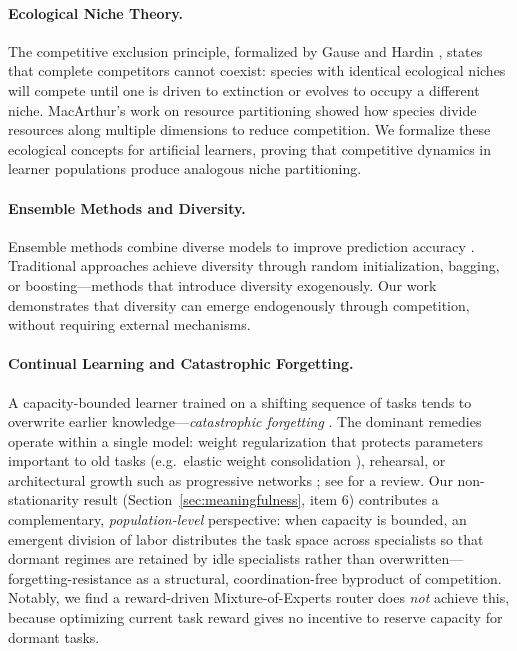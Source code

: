 \documentclass{article}
\begin{document}
\paragraph{Ecological Niche Theory.}
The competitive exclusion principle, formalized by Gause \cite{gause1934struggle} and Hardin \cite{hardin1960competitive}, states that complete competitors cannot coexist: species with identical ecological niches will compete until one is driven to extinction or evolves to occupy a different niche. MacArthur's work on resource partitioning \cite{macarthur1958population} showed how species divide resources along multiple dimensions to reduce competition. We formalize these ecological concepts for artificial learners, proving that competitive dynamics in learner populations produce analogous niche partitioning.

\paragraph{Ensemble Methods and Diversity.}
Ensemble methods combine diverse models to improve prediction accuracy \cite{dietterich2000ensemble}. Traditional approaches achieve diversity through random initialization, bagging, or boosting---methods that introduce diversity exogenously. Our work demonstrates that diversity can emerge endogenously through competition, without requiring external mechanisms.

\paragraph{Continual Learning and Catastrophic Forgetting.}
A capacity-bounded learner trained on a shifting sequence of tasks tends to overwrite earlier knowledge---\emph{catastrophic forgetting} \cite{french1999catastrophic}. The dominant remedies operate within a single model: weight regularization that protects parameters important to old tasks (e.g.\ elastic weight consolidation \cite{kirkpatrick2017overcoming}), rehearsal, or architectural growth such as progressive networks \cite{rusu2016progressive}; see \cite{parisi2019continual} for a review. Our non-stationarity result (Section~\ref{sec:meaningfulness}, item 6) contributes a complementary, \emph{population-level} perspective: when capacity is bounded, an emergent division of labor distributes the task space across specialists so that dormant regimes are retained by idle specialists rather than overwritten---forgetting-resistance as a structural, coordination-free byproduct of competition. Notably, we find a reward-driven Mixture-of-Experts router does \emph{not} achieve this, because optimizing current task reward gives no incentive to reserve capacity for dormant tasks.
\end{document}
